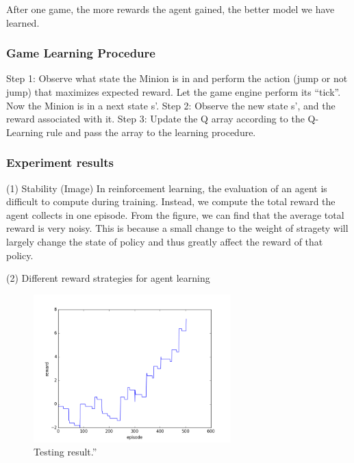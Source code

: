 \documentclass{acmsiggraph}
\begin{document}
After one game, the more rewards the agent gained, the better model we have learned.

\subsubsection{Game Learning Procedure}

Step 1: Observe what state the Minion is in and perform the action (jump or not jump) that maximizes expected reward. Let the game engine perform its “tick”. Now the Minion is in a next state s’.
Step 2: Observe the new state s’, and the reward associated with it.
Step 3: Update the Q array according to the Q-Learning rule and pass the array to the learning procedure.


\subsubsection{Experiment results}
(1) Stability (Image)
In reinforcement learning, the evaluation of an agent is difficult to compute during training. Instead, we compute the total reward the agent collects in one episode. From the figure, we can find that the average total reward is very noisy. This is because a small change to the weight of stragety will largely change the state of policy and thus greatly affect the reward of that policy. 

(2) Different reward strategies for agent learning





\begin{figure}[ht]
  \centering
  \includegraphics[width=3.0in]{../fig/reward_in_testing_5000.png}
  \caption{Testing result.''}
  \label{fig:result}
\end{figure}


\end{document}
